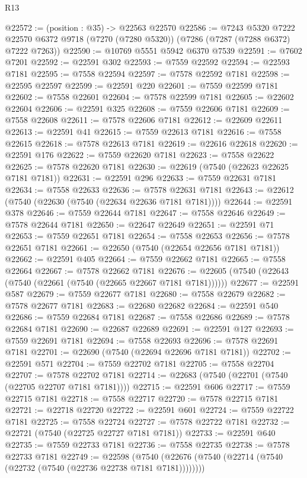 \begin{lexlean}{R13}
\begin{coremodule}
@22572 := (position : @35) -> @22563 @22570
@22586 := @7243
    @5320
    @7222
    @22570
    @6372
    @9718
    (@7270 (@7280 @5320))
    (@7286 (@7287 (@7288 @6372) @7222 @7263))
@22590 := @10769 @5551 @5942 @6370 @7539
@22591 := @7602 @7201
@22592 := @22591 @302
@22593 := @7559 @22592
@22594 := @22593 @7181
@22595 := @7558 @22594
@22597 := @7578 @22592 @7181
@22598 := @22595 @22597
@22599 := @22591 @220
@22601 := @7559 @22599 @7181
@22602 := @7558 @22601
@22604 := @7578 @22599 @7181
@22605 := @22602 @22604
@22606 := @22591 @325
@22608 := @7559 @22606 @7181
@22609 := @7558 @22608
@22611 := @7578 @22606 @7181
@22612 := @22609 @22611
@22613 := @22591 @41
@22615 := @7559 @22613 @7181
@22616 := @7558 @22615
@22618 := @7578 @22613 @7181
@22619 := @22616 @22618
@22620 := @22591 @176
@22622 := @7559 @22620 @7181
@22623 := @7558 @22622
@22625 := @7578 @22620 @7181
@22630 := @22619 (@7540 (@22623 @22625 @7181 @7181))
@22631 := @22591 @296
@22633 := @7559 @22631 @7181
@22634 := @7558 @22633
@22636 := @7578 @22631 @7181
@22643 := @22612 (@7540 (@22630 (@7540 (@22634 @22636 @7181 @7181))))
@22644 := @22591 @378
@22646 := @7559 @22644 @7181
@22647 := @7558 @22646
@22649 := @7578 @22644 @7181
@22650 := @22647 @22649
@22651 := @22591 @71
@22653 := @7559 @22651 @7181
@22654 := @7558 @22653
@22656 := @7578 @22651 @7181
@22661 := @22650 (@7540 (@22654 @22656 @7181 @7181))
@22662 := @22591 @405
@22664 := @7559 @22662 @7181
@22665 := @7558 @22664
@22667 := @7578 @22662 @7181
@22676 := @22605 (@7540 (@22643 (@7540 (@22661 (@7540 (@22665 @22667 @7181 @7181))))))
@22677 := @22591 @587
@22679 := @7559 @22677 @7181
@22680 := @7558 @22679
@22682 := @7578 @22677 @7181
@22683 := @22680 @22682
@22684 := @22591 @540
@22686 := @7559 @22684 @7181
@22687 := @7558 @22686
@22689 := @7578 @22684 @7181
@22690 := @22687 @22689
@22691 := @22591 @127
@22693 := @7559 @22691 @7181
@22694 := @7558 @22693
@22696 := @7578 @22691 @7181
@22701 := @22690 (@7540 (@22694 @22696 @7181 @7181))
@22702 := @22591 @571
@22704 := @7559 @22702 @7181
@22705 := @7558 @22704
@22707 := @7578 @22702 @7181
@22714 := @22683 (@7540 (@22701 (@7540 (@22705 @22707 @7181 @7181))))
@22715 := @22591 @606
@22717 := @7559 @22715 @7181
@22718 := @7558 @22717
@22720 := @7578 @22715 @7181
@22721 := @22718 @22720
@22722 := @22591 @601
@22724 := @7559 @22722 @7181
@22725 := @7558 @22724
@22727 := @7578 @22722 @7181
@22732 := @22721 (@7540 (@22725 @22727 @7181 @7181))
@22733 := @22591 @640
@22735 := @7559 @22733 @7181
@22736 := @7558 @22735
@22738 := @7578 @22733 @7181
@22749 := @22598
    (@7540 (@22676 (@7540 (@22714 (@7540 (@22732 (@7540 (@22736 @22738 @7181 @7181))))))))

\end{coremodule}
\end{lexlean}
